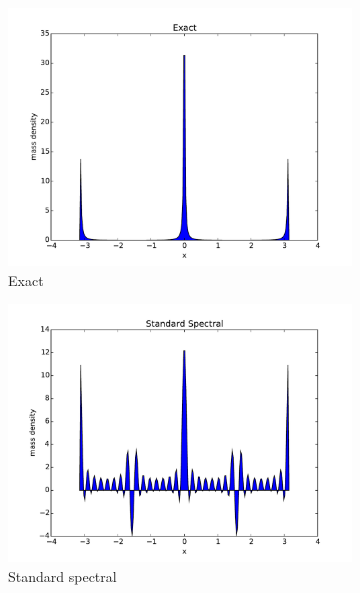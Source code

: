 \documentclass[12pt]{amsart}
\begin{document}
\begin{figure}
	\begin{subfigure}{0.3\textwidth}
		\includegraphics[width=\textwidth]{./images/exact_1D.pdf}
		\caption{Exact}
		\label{fig:exact}
	\end{subfigure}
	\begin{subfigure}{0.3\textwidth}
		\includegraphics[width=\textwidth]{./images/standard_spectral_1D.pdf}
		\caption{Standard spectral}
		\label{fig:standard spectral}
	\end{subfigure}
	\begin{subfigure}{0.3\textwidth}

\end{subfigure}
\end{figure}
\end{document}
